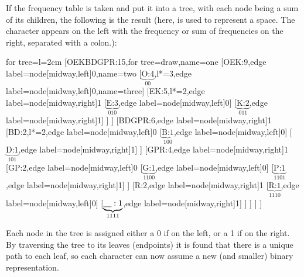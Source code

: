\documentclass{article}
\begin{document}
\noindent If the frequency table is taken and put it into a tree, with each node being a sum of its children, the following is the result (here, \underline{\hspace{10pt}} is used to represent a space. The character appears on the left with the frequency or sum of frequencies on the right, separated with a colon.): 
	\begin{center}
		\begin{forest}
		for tree={l=2cm}
			[OEKBDGPR\underline{\hspace{10pt}}:15,for tree=draw,name=one
				[OEK:9,edge label={node[midway,left]{0}},name=two
					[$\underbrace{\text{O:4}}_{00}$,l*=3,edge label={node[midway,left]{0}},name=three]
					[EK:5,l*=2,edge label={node[midway,right]{1}}
						[$\underbrace{\text{E:3}}_{010}$,edge label={node[midway,left]{0}}]
						[$\underbrace{\text{K:2}}_{011}$,edge label={node[midway,right]{1}}]
					]
				]
				[BDGPR\underline{\hspace{10pt}}:6,edge label={node[midway,right]{1}}
					[BD:2,l*=2,edge label={node[midway,left]{0}}
						[$\underbrace{\text{B:1}}_{100}$,edge label={node[midway,left]{0}}]
						[$\underbrace{\text{D:1}}_{101}$,edge label={node[midway,right]{1}}]
					]
					[GPR\underline{\hspace{10pt}}:4,edge label={node[midway,right]{1}}
						[GP:2,edge label={node[midway,left]{0}}
							[$\underbrace{\text{G:1}}_{1100}$,edge label={node[midway,left]{0}}]
							[$\underbrace{\text{P:1}}_{1101}$,edge label={node[midway,right]{1}}]
						]
						[R\underline{\hspace{10pt}}:2,edge label={node[midway,right]{1}}
							[$\underbrace{\text{R:1}}_{1110}$,edge label={node[midway,left]{0}}]
							[$\underbrace{\text{\underline{\hspace{10pt}}}:1}_{1111}$,edge label={node[midway,right]{1}}]
						]
					]
				]
			]
		\end{forest}
	\end{center}
\noindent Each node in the tree is assigned either a 0 if on the left, or a 1 if on the right. By traversing the tree to its leaves (endpoints) it is found that there is a unique path to each leaf, so each character can now assume a new (and smaller) binary representation.
\end{document}
